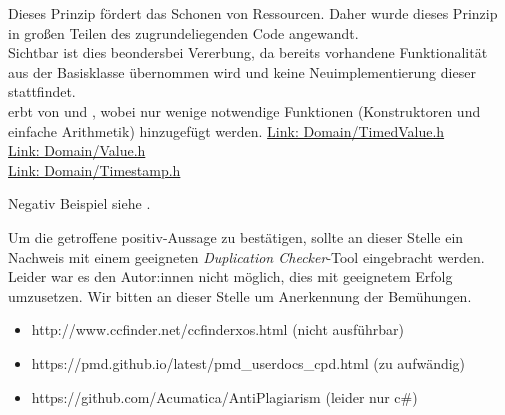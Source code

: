Dieses Prinzip fördert das Schonen von Ressourcen. Daher wurde dieses Prinzip in großen Teilen des zugrundeliegenden Code angewandt.\\
Sichtbar ist dies beondersbei Vererbung, da bereits vorhandene Funktionalität aus der Basisklasse übernommen wird und keine Neuimplementierung dieser stattfindet.
\zB\\
 erbt von  und , wobei nur wenige notwendige Funktionen (Konstruktoren und einfache Arithmetik) hinzugefügt werden.
\href{https://github.com/MobMonRob/ROSLabDrohne/blob/fe35195d45d7246eacdac0165036204d47e10ed6/Code/Domain/include/Domain/TimedValue.h}{Link: Domain/TimedValue.h}\\
\href{https://github.com/MobMonRob/ROSLabDrohne/blob/fe35195d45d7246eacdac0165036204d47e10ed6/Code/Domain/include/Domain/Value.h}{Link: Domain/Value.h}\\
\href{https://github.com/MobMonRob/ROSLabDrohne/blob/fe35195d45d7246eacdac0165036204d47e10ed6/Code/Domain/include/Domain/Timestamp.h}{Link: Domain/Timestamp.h}


Negativ Beispiel siehe .


Um die getroffene positiv-Aussage zu bestätigen, sollte an dieser Stelle ein Nachweis mit einem geeigneten \textit{Duplication Checker}-Tool eingebracht werden.
Leider war es den Autor:innen nicht möglich, dies mit geeignetem Erfolg umzusetzen. Wir bitten an dieser Stelle um Anerkennung der Bemühungen.

\begin{itemize}
\item http://www.ccfinder.net/ccfinderxos.html (nicht ausführbar)
\item https://pmd.github.io/latest/pmd\_userdocs\_cpd.html (zu aufwändig)
\item https://github.com/Acumatica/AntiPlagiarism (leider nur c\#)
\end{itemize}

